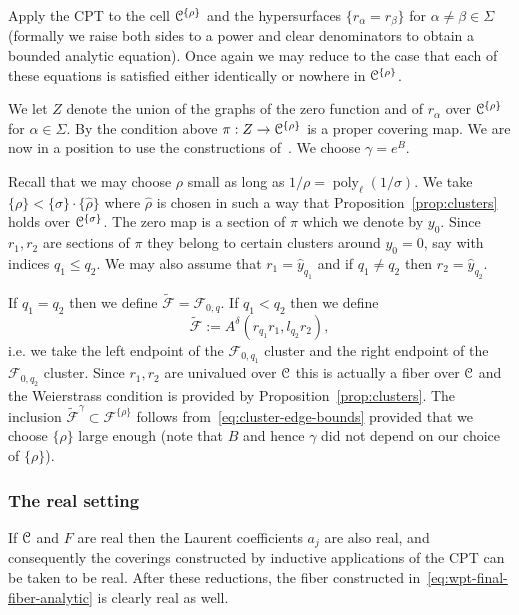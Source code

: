 \documentclass[reqno]{amsart}
\renewcommand\~[1]{\widetilde{#1}}
\def\poly{\operatorname{poly}} \def\J{\operatorname{J}}
\def\cF{{\mathcal F}} \def\cL{{\mathcal L}} \def\cR{{\mathcal R}}
\def\he#1{{\{#1\}}}
\def\hrho{{\he\rho}}
\def\hsigma{{\he\sigma}}
\begin{document}
Apply the CPT to the cell $\cC^\hrho$ and the hypersurfaces
$\{r_\alpha=r_\beta\}$ for $\alpha\neq\beta\in\Sigma$ (formally we
raise both sides to a power and clear denominators to obtain a bounded
analytic equation). Once again we may reduce to the case that each of
these equations is satisfied either identically or nowhere in
$\cC^\hrho$.

We let $Z$ denote the union of the graphs of the zero function and of
$r_\alpha$ over $\cC^\hrho$ for $\alpha\in\Sigma$. By the condition
above $\pi:Z\to\cC^\hrho$ is a proper covering map. We are now in a
position to use the constructions of~. We
choose $\gamma=e^B$.

Recall that we may choose $\rho$ small as long as
$1/\rho=\poly_\ell(1/\sigma)$. We take
$\hrho<\hsigma\cdot\he{\hat\rho}$ where $\hat\rho$ is chosen in such a
way that Proposition~\ref{prop:clusters} holds over $\cC^\hsigma$. The
zero map is a section of $\pi$ which we denote by $y_0$. Since
$r_1,r_2$ are sections of $\pi$ they belong to certain clusters around
$y_0=0$, say with indices $q_1\le q_2$. We may also assume that
$r_1=\hat y_{q_1}$ and if $q_1\neq q_2$ then $r_2=\hat y_{q_2}$.

If $q_1=q_2$ then we define $\tilde\cF=\cF_{0,q}$. If $q_1<q_2$ then we define
\begin{equation}\label{eq:wpt-final-fiber-analytic}
  \tilde\cF:= A^\delta(r_{q_1}r_1,l_{q_2}r_2),
\end{equation}
i.e. we take the left endpoint of the $\cF_{0,q_1}$ cluster and the
right endpoint of the $\cF_{0,q_2}$ cluster. Since $r_1,r_2$ are
univalued over ${\mathcal C}$ this is actually a fiber over ${\mathcal C}$ and the
Weierstrass condition is provided by Proposition~\ref{prop:clusters}.
The inclusion $\tilde\cF^\gamma\subset\cF^\hrho$ follows
from~\eqref{eq:cluster-edge-bounds} provided that we choose $\hrho$
large enough (note that $B$ and hence $\gamma$ did not depend on our
choice of $\hrho$).

\subsubsection{The real setting}

If ${\mathcal C}$ and $F$ are real then the Laurent coefficients $a_j$ are also
real, and consequently the coverings constructed by inductive
applications of the CPT can be taken to be real. After these
reductions, the fiber constructed in~\eqref{eq:wpt-final-fiber-analytic}
is clearly real as well.
\end{document}
